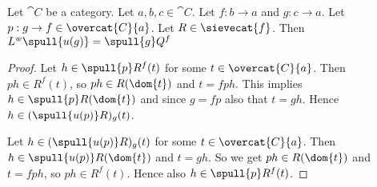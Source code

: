 \begin{lemma}
Let $\cat{C}$ be a category.
Let $a,b,c \in \cat{C}$.
Let $f: b\rightarrow a$ and $g: c \rightarrow a$.
Let $p: g \rightarrow f \in \overcat{C}{a}$.
Let $R\in \sievecat{f}$.
Then $L^w \spull{u(g)}= \spull{g} Q^f$
\end{lemma}

\begin{proof}
Let $h \in \spull{p}R^f(t)$ for some $t\in \overcat{C}{a}$. 
Then $ph \in R^f(t)$, so $ph \in R(\dom{t})$ and $t = fph$.
This implies $h\in \spull{p}R(\dom{t})$ and since $g = fp$ also that $t = gh$.
Hence $h\in (\spull{u(p)}R)_g(t)$.

Let $h \in (\spull{u(p)}R)_g(t)$ for some $t\in \overcat{C}{a}$.
Then $h \in \spull{u(p)}R(\dom{t})$ and $t = gh$.
So we get $ph \in R(\dom{t})$ and $t = fph$, 
so $ph\in R^f(t)$.
Hence also $h\in \spull{p}R^f(t)$.
\end{proof}